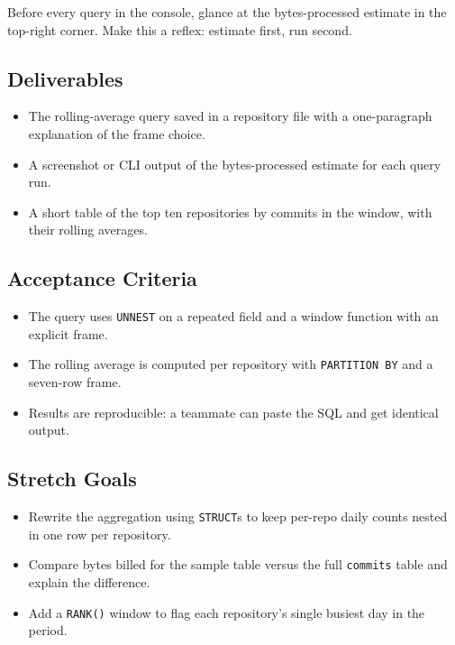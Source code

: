 \begin{notebox}
Before every query in the console, glance at the bytes-processed estimate in the top-right corner. Make this a reflex: estimate first, run second.
\end{notebox}

\subsection*{Deliverables}
\begin{itemize}
    \item The rolling-average query saved in a repository file with a one-paragraph explanation of the frame choice.
    \item A screenshot or CLI output of the bytes-processed estimate for each query run.
    \item A short table of the top ten repositories by commits in the window, with their rolling averages.
\end{itemize}

\subsection*{Acceptance Criteria}
\begin{itemize}
    \item The query uses \texttt{UNNEST} on a repeated field and a window function with an explicit frame.
    \item The rolling average is computed per repository with \texttt{PARTITION BY} and a seven-row frame.
    \item Results are reproducible: a teammate can paste the SQL and get identical output.
\end{itemize}

\subsection*{Stretch Goals}
\begin{itemize}
    \item Rewrite the aggregation using \texttt{STRUCT}s to keep per-repo daily counts nested in one row per repository.
    \item Compare bytes billed for the sample table versus the full \texttt{commits} table and explain the difference.
    \item Add a \texttt{RANK()} window to flag each repository's single busiest day in the period.
\end{itemize}

